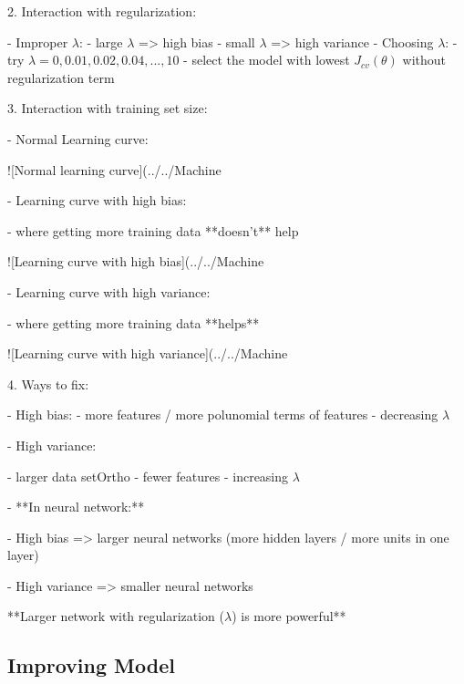 2. Interaction with regularization:

- Improper $\lambda$:
- large $\lambda$ => high bias
- small $\lambda$ => high variance
- Choosing $\lambda$:
- try $\lambda=0,0.01,0.02,0.04,...,10$
- select the model with lowest $J_{cv}(\theta)$ without regularization term

3. Interaction with training set size:

- Normal Learning curve:

![Normal learning curve](../../Machine%

- Learning curve with high bias:

- where getting more training data **doesn't** help

![Learning curve with high bias](../../Machine%

- Learning curve with high variance:

- where getting more training data **helps**

![Learning curve with high variance](../../Machine%

4. Ways to fix:

- High bias:
- more features / more polunomial terms of features
- decreasing $\lambda$

- High variance:

- larger data setOrtho
- fewer features
- increasing $\lambda$

- **In neural network:**

- High bias => larger neural networks (more hidden layers / more units in one layer)

- High variance => smaller neural networks

**Larger network with regularization ($\lambda$) is more powerful**

\subsection{Improving Model}

